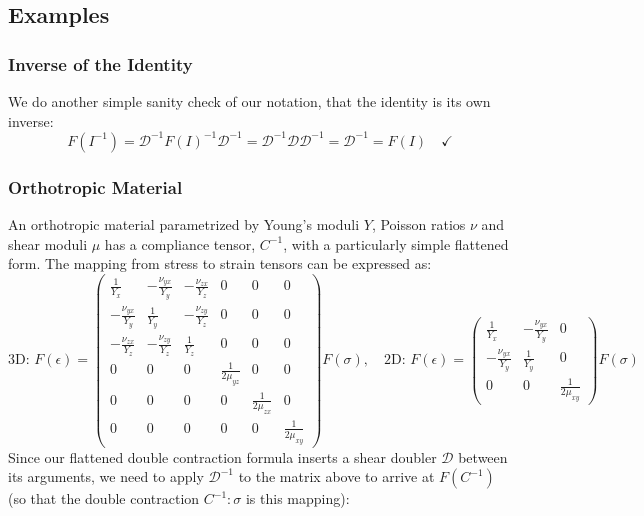 \documentclass[10pt]{article}
\begin{document}
\subsection{Examples}
\subsubsection{Inverse of the Identity}
We do another simple sanity check of our notation, that the identity is its own
inverse:
$$
F(I^{-1}) = \mathscr{D}^{-1} F(I)^{-1} \mathscr{D}^{-1} = \mathscr{D}^{-1} \mathscr{D} \mathscr{D}^{-1} = \mathscr{D}^{-1} = F(I) \quad \checkmark
$$

\subsubsection{Orthotropic Material}
An orthotropic material parametrized by Young's moduli $Y$, Poisson ratios $\nu$
and shear moduli $\mu$ has a compliance tensor, $C^{-1}$, with a particularly simple
flattened form. The mapping from stress to strain tensors can be expressed as:
$$
\text{3D: } F(\epsilon) =
\begin{pmatrix}
    \frac{1}{Y_x} & -\frac{\nu_{yx}}{Y_y} & -\frac{\nu_{zx}}{Y_z} & 0 & 0 & 0 \\
    -\frac{\nu_{yx}}{Y_y} & \frac{1}{Y_y} & -\frac{\nu_{zy}}{Y_z} & 0 & 0 & 0 \\
    -\frac{\nu_{zx}}{Y_z} & -\frac{\nu_{zy}}{Y_z} & \frac{1}{Y_z} & 0 & 0 & 0 \\
    0 & 0 & 0 & \frac{1}{2 \mu_{yz}} & 0 & 0 \\
    0 & 0 & 0 & 0 & \frac{1}{2 \mu_{zx}} & 0 \\
    0 & 0 & 0 & 0 & 0 & \frac{1}{2 \mu_{xy}}
\end{pmatrix} F(\sigma), \quad
\text{2D: } F(\epsilon) = 
\begin{pmatrix}
    \frac{1}{Y_x} & -\frac{\nu_{yx}}{Y_y} & 0 \\
    -\frac{\nu_{yx}}{Y_y} & \frac{1}{Y_y}  & 0 \\
    0 & 0 & \frac{1}{2 \mu_{xy}}
\end{pmatrix} F(\sigma)
$$
Since our flattened double contraction formula inserts a shear doubler $\mathscr{D}$ between its
arguments, we need to apply $\mathscr{D}^{-1}$ to the matrix above to arrive at $F(C^{-1})$
(so that the double contraction $C^{-1} : \sigma$ is this mapping):
\end{document}
